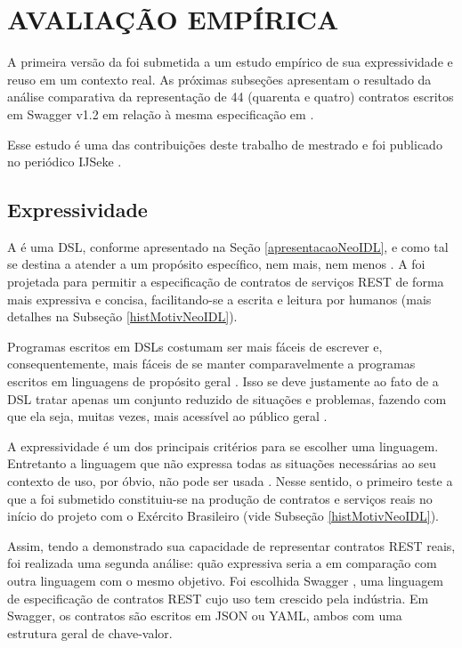 \section{AVALIAÇÃO EMPÍRICA}
\label{EstudoExpressividadeReuso}
\vspace{-6mm}

A primeira versão da \neoidl{} foi submetida a um estudo empírico de sua expressividade 
e reuso em um contexto real. As próximas subseções apresentam 
o resultado da análise comparativa da representação de 44 (quarenta e quatro)
contratos escritos em Swagger v1.2 em relação à mesma especificação em
\neoidl{}.

Esse estudo é uma das contribuições deste trabalho de mestrado e foi publicado
no periódico IJSeke \cite{lima2015neoidl}.

\subsection{Expressividade}
\label{estudoExpressividadeNeoIDL}
\vspace{-6mm}

A \neoidl{} é uma DSL, conforme apresentado na Seção \ref{apresentacaoNeoIDL},
e como tal se destina a atender a um propósito específico, nem mais, nem menos
\cite{hudak1998modular}. A \neoidl{} foi projetada para permitir a
especificação de contratos de serviços REST de forma mais expressiva e concisa,
facilitando-se a escrita e leitura por humanos (mais detalhes na Subseção
\ref{histMotivNeoIDL}).

Programas escritos em DSLs costumam ser mais fáceis de escrever e,
consequentemente, mais fáceis de se manter comparavelmente a programas escritos
em linguagens de propósito geral \cite{hudak1998modular}. Isso se deve
justamente ao fato de a DSL tratar apenas um conjunto reduzido de situações e
problemas, fazendo com que ela seja, muitas vezes, mais acessível ao público
geral \cite{taha2008domain}.

A expressividade é um dos principais critérios para se escolher uma
linguagem. Entretanto a linguagem que não expressa todas as situações
necessárias ao seu contexto de uso, por óbvio, não pode ser usada
\cite{mackinlay1985expressiveness}. Nesse sentido, o primeiro teste a que a
\neoidl{} foi submetido constituiu-se na produção de contratos e serviços reais
no início do projeto com o Exército Brasileiro (vide Subseção \ref{histMotivNeoIDL}).

Assim, tendo a \neoidl{} demonstrado sua capacidade de representar contratos
REST reais, foi realizada uma segunda análise: quão expressiva seria a
\neoidl{} em comparação com outra linguagem com o mesmo objetivo. Foi escolhida
Swagger \cite{swaggerSite}, uma linguagem de especificação de contratos REST
cujo uso tem crescido pela indústria.
Em Swagger, os contratos são escritos em JSON\cite{JSon} ou YAML\cite{YAML},
ambos com uma estrutura geral de chave-valor.

